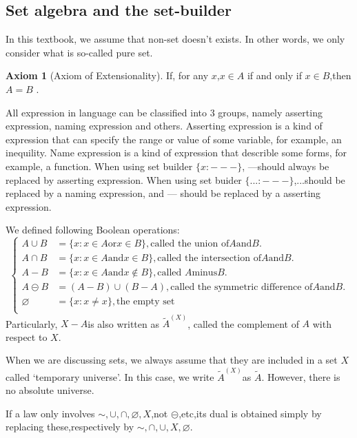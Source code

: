 \documentclass[a4paper,11pt]{article}%
\theoremstyle{remark}
\theoremstyle{definition}
\theoremstyle{definition}
\theoremstyle{plain}
\theoremstyle{definition}
\newtheorem{axiom}{Axiom}
\begin{document}
\subsection{Set algebra and the set-builder}
In this textbook, we assume that non-set doesn't exists. In 
other words, we only consider what is so-called pure set.
\begin{axiom}[Axiom of Extensionality]
If, for any $x$,$x\in A$ if and only if $x\in B$,then $A=B$ .
\end{axiom}
All expression in language can be classified into 3 groups, namely 
asserting expression, naming expression and others. 
Asserting expression is a kind of expression that can specify the range or 
value of some variable, for example, an inequility.
Name expression is a kind of expression that describle some forms, for example,
a function.
When using set builder 
$\{x:---\}$, ---should always be replaced by asserting expression.
When using set buider $\{...:---\}$,...should be replaced by a naming expression,
and --- should be replaced by a asserting expression.

We defined following Boolean operations:
\[
\begin{cases}
    A \cup B & =  \{x:x\in A \text{or} x \in B\},\text{called the union of} A \text{and} B.\\
    A \cap B & =  \{x:x\in A \text{and} x \in B\},\text{called the intersection of} A \text{and} B.\\
    A - B & =  \{x:x\in A \text{and} x \notin B\},\text{called } A \text{minus} B.\\
    A \circleddash  B & =  (A-B)\cup(B-A),\text{called the symmetric difference of} A \text{and} B.\\
    \varnothing & =  \{x:x \neq x\}, \text{the empty set}\\
\end{cases}
\]
Particularly, $X-A$is also written as $\tilde{A}^{(X)}$, called the complement of $A$ with respect to $X$.

When we are discussing sets, we always assume that they are included in a set $X$ called `temporary universe'.
In this case, we write $\tilde{A}^{(X)}$as $\tilde{A}$.
However, there is no absolute universe.

If a law only involves $\sim,\cup,\cap,\varnothing,X$,not $\circleddash$,etc,its dual 
is obtained simply by replacing these,respectively by $\sim,\cap,\cup,X,\varnothing$.
\end{document}
